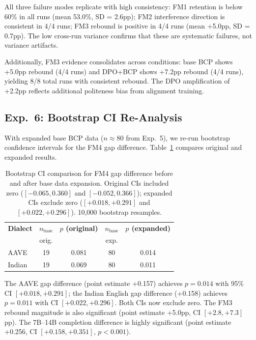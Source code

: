 \documentclass[11pt,a4paper]{article}
\newcommand{\fm}[1]{\textsc{FM#1}}
\newcommand{\bcp}{\textsc{BCP}}
\begin{document}
All three failure modes replicate with high consistency: \fm{1} retention is below 60\% in all runs (mean 53.0\%, SD = 2.6pp); \fm{2} interference direction is consistent in 4/4 runs; \fm{3} rebound is positive in 4/4 runs (mean +5.0pp, SD = 0.7pp).
The low cross-run variance confirms that these are systematic failures, not variance artifacts.

Additionally, \fm{3} evidence consolidates across conditions: base \bcp{} shows +5.0pp rebound (4/4 runs) and DPO+\bcp{} shows +7.2pp rebound (4/4 runs), yielding 8/8 total runs with consistent rebound.
The DPO amplification of +2.2pp reflects additional politeness bias from alignment training.

\subsection{Exp.~6: Bootstrap CI Re-Analysis}
\label{sec:exp6}

With expanded base \bcp{} data ($n \approx 80$ from Exp.~5), we re-run bootstrap confidence intervals for the \fm{4} gap difference.
Table~\ref{tab:bootstrap} compares original and expanded results.

\begin{table}[t]
\centering
\small
\begin{tabular}{@{}lcccc@{}}
\toprule
\textbf{Dialect} & $n_{\text{base}}$ & \textbf{$p$ (original)} & $n_{\text{base}}$ & \textbf{$p$ (expanded)} \\
 & \small{orig.} & & \small{exp.} & \\
\midrule
AAVE & 19 & 0.081 & 80 & 0.014 \\
Indian & 19 & 0.069 & 80 & 0.011 \\
\bottomrule
\end{tabular}
\caption{Bootstrap CI comparison for \fm{4} gap difference before and after base data expansion. Original CIs included zero ($[-0.065, 0.360]$ and $[-0.052, 0.366]$); expanded CIs exclude zero ($[+0.018, +0.291]$ and $[+0.022, +0.296]$). 10,000 bootstrap resamples.}
\label{tab:bootstrap}
\end{table}

The AAVE gap difference (point estimate +0.157) achieves $p = 0.014$ with 95\% CI $[+0.018, +0.291]$; the Indian English gap difference (+0.158) achieves $p = 0.011$ with CI $[+0.022, +0.296]$.
Both CIs now exclude zero.
The \fm{3} rebound magnitude is also significant (point estimate +5.0pp, CI $[+2.8, +7.3]$pp).
The 7B--14B completion difference is highly significant (point estimate +0.256, CI $[+0.158, +0.351]$, $p < 0.001$).
\end{document}
